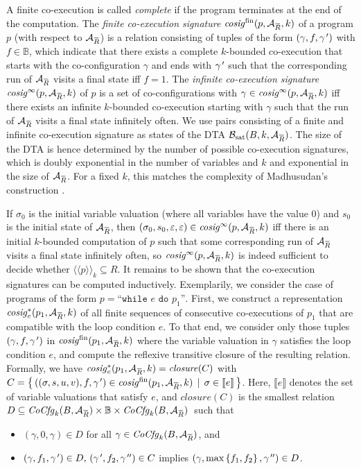 \documentclass[submission,copyright,creativecommons]{eptcs}
\newcommand{\overbar}[1]{\mkern 1.5mu\overline{\mkern-1.5mu#1\mkern-1.5mu}\mkern 1.5mu}\newcommand{\nothing}{$\,$}
\newcommand{\ignore}[1]{}
\newcommand{\z}[1]{\text{#1}}
\newcommand{\set}[1]{\left\{ #1 \right\}}
\newcommand{\condset}[2]{\left\{ \, #1 \, \mid \, #2 \, \right\}}
\newcommand{\aut}[1]{\mathcal{#1}}
\newcommand{\specaut}{\aut{A}_{\overbar{R}}}
\newcommand{\f}[1]{\mathit{#1}}
\newcommand{\sembrack}[1]{\llbracket #1 \rrbracket}
\newcommand{\sembrackk}[1]{\langle\langle #1 \rangle\rangle}\newcommand{\lbar}[1]{\overline{#1}}
\newcommand{\cocfgk}{\f{CoCfg}_k(B,\specaut)}
\newcommand{\kfg}{\gamma}
\begin{document}
A finite co-execution is called \emph{complete} if the program terminates at
the end of the computation.
The \emph{finite co-execution signature} $\f{cosig}^\z{fin}(p,\specaut,k)$
of a program $p$ (with respect to $\specaut$) is a relation consisting of
tuples of the form $(\kfg,f,\kfg\kern+.11em')$ with $f \in \mathbb{B}$,
which indicate that there exists a complete $k$-bounded co-execution that\ignore{TODO: k-bounded co-execution? Definition?}
starts with the co-configuration $\kfg$ and ends with $\kfg\kern+.11em'$ such that the corresponding
run of $\specaut$ visits a final state iff $f=1$.
The \emph{infinite co-execution signature}
$\f{cosig}^\infty(p,\specaut,k)$ of $p$ is a set of co-configurations with
$\gamma \in \f{cosig}^\infty(p,\specaut,k)$ iff there exists an infinite
$k$-bounded co-execution starting with $\kfg$ such that the run of $\specaut$
visits a final state infinitely often.
We use pairs consisting of a finite and infinite co-execution signature as
states of the DTA $\aut{B}_\z{sat}(B,k,\specaut)$.
The size of the DTA is hence determined by the number of possible
co-execution signatures, which is doubly exponential in the number of
variables and $k$ and exponential in the size of $\specaut$.
For a fixed $k$, this matches the complexity of Madhusudan's construction
\cite{madhusudan:LIPIcs:2011:3247}.

If $\sigma_0$ is the initial variable valuation (where all variables have the value
$0$) and $s_0$ is the initial state of $\specaut$, then
$(\sigma_0,s_0,\varepsilon,\varepsilon) \in \f{cosig}^\infty(p,\specaut,k)$
iff there is an initial $k$-bounded computation of $p$ such that some
corresponding run of $\specaut$ visits a final state infinitely often,
so $\f{cosig}^\infty(p,\specaut,k)$ is indeed sufficient to decide whether
$\sembrackk{p}_k \subseteq R$.
It remains to be shown that the co-execution signatures can be computed
inductively.
Exemplarily, we consider the case of programs of the form
$p = \z{``}\texttt{while } e \texttt{ do } p_1\z{''}$.
First, we construct a representation $\f{cosig}^*_e(p_1,\specaut,k)$
of all finite sequences of consecutive
co-executions of $p_1$ that are compatible with the loop condition $e$.
To that end, we consider only
those tuples $(\kfg,f,\kfg\kern+.11em')$ in $\f{cosig}^\z{fin}(p_1,\specaut,k)$
where the variable valuation in $\kfg$
satisfies the loop condition $e$, and compute the reflexive transitive closure
of the resulting relation.
Formally, we have
$\f{cosig}^*_e(p_1,\specaut,k) = \f{closure}(C)$ with
$C = \condset {
			( (\sigma,s,u,v), f, \kfg\kern+.11em' ) \in \f{cosig}^\z{fin}(p_1,\specaut,k)
		}{ \sigma \in \sembrack{e} }$.
Here, $\sembrack{e}$ denotes the set of variable valuations that satisfy $e$,
and $\f{closure}(C)$ is the smallest relation
$D \subseteq \cocfgk \times \mathbb{B} \times \cocfgk$
\,such that
\begin{itemize}
	\item $(\kfg, 0, \kfg) \in D$ for all $\kfg \in \cocfgk$, and
	\item $(\kfg, f_1, \kfg\kern+.11em') \in D, \, (\kfg\kern+.11em', f_2, \kfg\kern+.11em'') \in C$ implies $(\kfg, \max\set{f_1,f_2}, \kfg\kern+.11em'') \in D$.
\end{itemize}
\end{document}
